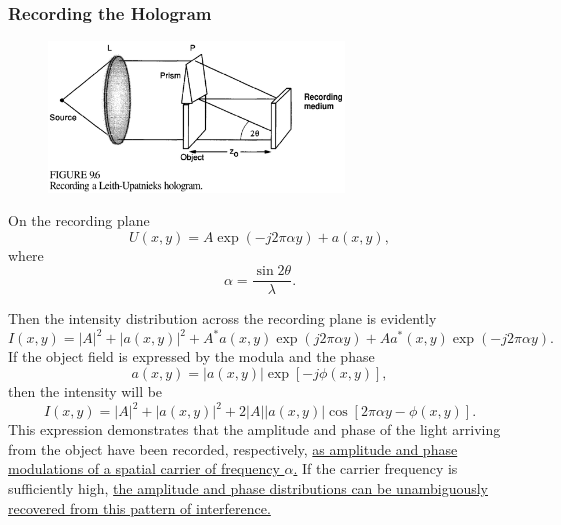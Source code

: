 \documentclass[en,hazy,device=normal,blue,14pt]{elegantnote}
\begin{document}
\subsubsection{Recording the Hologram}
\begin{figure}[htbp]
  \centering
  \includegraphics[width=0.7\textwidth]{6.PNG}
\end{figure}

On the recording plane
\begin{equation}
  U\left( {x,y} \right) = A\exp \left( { - j2\pi \alpha y} \right) + a\left( {x,y} \right),
\end{equation}
where 
\begin{equation}
  \alpha = \frac {\sin2\theta}{\lambda}.
\end{equation}

Then the intensity distribution across the recording plane is evidently
\begin{equation}
  I\left( {x,y} \right) = {\left| A \right|^2} + {\left| {a\left( {x,y} \right)} \right|^2} + {A^*}a\left( {x,y} \right)\exp \left( {j2\pi \alpha y} \right) + A{a^*}\left( {x,y} \right)\exp \left( { - j2\pi \alpha y} \right).
\end{equation}
If the object field is expressed by the modula and the phase
\begin{equation}
  a\left( {x,y} \right) = \left| {a\left( {x,y} \right)} \right|\exp \left[ { - j\phi \left( {x,y} \right)} \right],
\end{equation}
then the intensity will be
\begin{equation}
  I\left( {x,y} \right) = {\left| A \right|^2} + {\left| {a\left( {x,y} \right)} \right|^2} + 2\left| A \right|\left| {a\left( {x,y} \right)} \right|\cos \left[ {2\pi \alpha y - \phi \left( {x,y} \right)} \right].
\end{equation}
This expression demonstrates that the amplitude and phase of the light arriving from the object have been recorded, respectively, \uline{as amplitude and phase modulations of a spatial carrier of frequency $\alpha$.} If the carrier frequency is sufficiently high, \uline{the amplitude and phase distributions can be unambiguously
recovered from this pattern of interference.}
\end{document}
